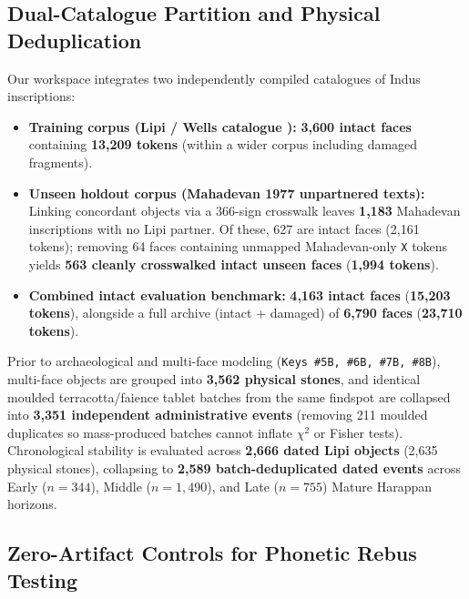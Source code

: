 \documentclass[11pt,a4paper]{article}
\begin{document}
\subsection{Dual-Catalogue Partition and Physical Deduplication}

Our workspace integrates two independently compiled catalogues of Indus inscriptions:
\begin{itemize}
  \item \textbf{Training corpus (Lipi / Wells catalogue \citep{wells2015}):} \textbf{3,600 intact faces} containing \textbf{13,209 tokens} (within a wider corpus including damaged fragments).
  \item \textbf{Unseen holdout corpus (Mahadevan 1977 \citep{mahadevan1977} unpartnered texts):} Linking concordant objects via a 366-sign crosswalk leaves \textbf{1,183} Mahadevan inscriptions with no Lipi partner. Of these, 627 are intact faces (2,161 tokens); removing 64 faces containing unmapped Mahadevan-only \texttt{X} tokens yields \textbf{563 cleanly crosswalked intact unseen faces} (\textbf{1,994 tokens}).
  \item \textbf{Combined intact evaluation benchmark:} \textbf{4,163 intact faces} (\textbf{15,203 tokens}), alongside a full archive (intact + damaged) of \textbf{6,790 faces} (\textbf{23,710 tokens}).
\end{itemize}

Prior to archaeological and multi-face modeling (\texttt{Keys \#5B, \#6B, \#7B, \#8B}), multi-face objects are grouped into \textbf{3,562 physical stones}, and identical moulded terracotta/faience tablet batches from the same findspot are collapsed into \textbf{3,351 independent administrative events} (removing 211 moulded duplicates so mass-produced batches cannot inflate $\chi^2$ or Fisher tests). Chronological stability is evaluated across \textbf{2,666 dated Lipi objects} (2,635 physical stones), collapsing to \textbf{2,589 batch-deduplicated dated events} across Early ($n = 344$), Middle ($n = 1{,}490$), and Late ($n = 755$) Mature Harappan horizons.

\subsection{Zero-Artifact Controls for Phonetic Rebus Testing}
\end{document}
